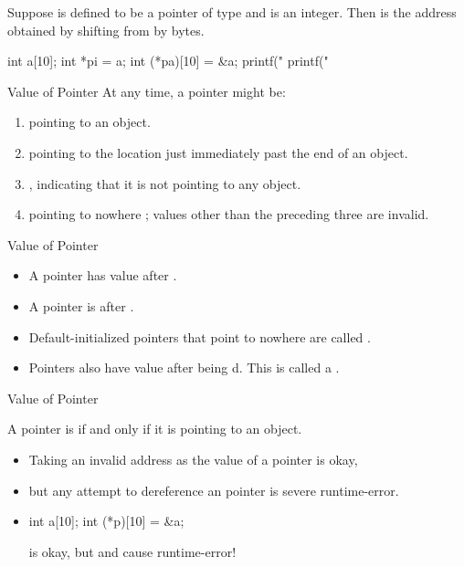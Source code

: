 \documentclass[handout]{beamer}
\begin{document}
\begin{frame}[fragile]
    \begin{thm}
        Suppose  is defined to be a pointer of type  and  is an integer. Then  is the address obtained by shifting from  by  bytes.
    \end{thm}
    \pause
    \begin{cpp}
int a[10];
int *pi = a;
int (*pa)[10] = &a;
printf("%
printf("%
    \end{cpp}
\end{frame}

\begin{frame}{Value of Pointer}
    At any time, a pointer might be:
    \begin{enumerate}
        \item pointing to an object.
        \item pointing to the location just immediately past the end of an object.
        \item {}, indicating that it is not pointing to any object.
        \item pointing to nowhere ; values other than the preceding three are invalid.
    \end{enumerate}
\end{frame}

\begin{frame}{Value of Pointer}
    \begin{itemize}
        \item A pointer has  value after .
        \item A pointer is  after .
        \pause
        \item Default-initialized pointers that point to nowhere are called .
        \item Pointers also have  value after being d. This is called a .
    \end{itemize}
\end{frame}

\begin{frame}[fragile]{Value of Pointer}
    \begin{thm}
        A pointer is  if and only if it is pointing to an object.
    \end{thm}
    \begin{itemize}
        \item Taking an invalid address as the value of a pointer is okay,
        \item but any attempt to dereference an  pointer is severe runtime-error.
        \pause
        \item \begin{cpp}
int a[10];
int (*p)[10] = &a;
        \end{cpp}
         is okay, but  and  cause runtime-error!
    \end{itemize}
\end{frame}
\end{document}
